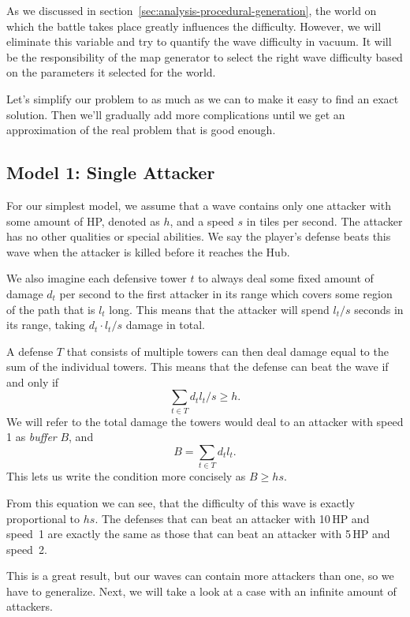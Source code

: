 As we discussed in section~\ref{sec:analysis-procedural-generation}, the world on which the battle takes place greatly influences the difficulty.
However, we will eliminate this variable and try to quantify the wave difficulty in vacuum.
It will be the responsibility of the map generator to select the right wave difficulty based on the parameters it selected for the world.

Let's simplify our problem to as much as we can to make it easy to find an exact solution.
Then we'll gradually add more complications until we get an approximation of the real problem that is good enough.

\subsection{Model 1: Single Attacker}\label{sec:analysis-waves-single}
For our simplest model, we assume that a wave contains only one attacker with some amount of HP, denoted as $h$, and a speed $s$ in tiles per second.
The attacker has no other qualities or special abilities.
We say the player's defense beats this wave when the attacker is killed before it reaches the Hub.

We also imagine each defensive tower $t$ to always deal some fixed amount of damage $d_t$ per second to the first attacker in its range which covers some region of the path that is $l_t$ long.
This means that the attacker will spend $l_t / s$ seconds in its range, taking $d_t \cdot l_t / s$ damage in total.

A defense $T$ that consists of multiple towers can then deal damage equal to the sum of the individual towers.
This means that the defense can beat the wave if and only if
\begin{equation*}
    \sum_{t \in T} d_t l_t / s \geq h.
\end{equation*}
We will refer to the total damage the towers would deal to an attacker with speed 1 as \emph{buffer} $B$, and
\begin{equation}\label{eqn:B}
    B = \sum_{t \in T} d_t l_t.
\end{equation}
This lets us write the condition more concisely as $B \geq hs$.

From this equation we can see, that the difficulty of this wave is exactly proportional to $hs$.
The defenses that can beat an attacker with 10\,HP and speed~1 are exactly the same as those that can beat an attacker with 5\,HP and speed~2.

This is a great result, but our waves can contain more attackers than one, so we have to generalize.
Next, we will take a look at a case with an infinite amount of attackers.

